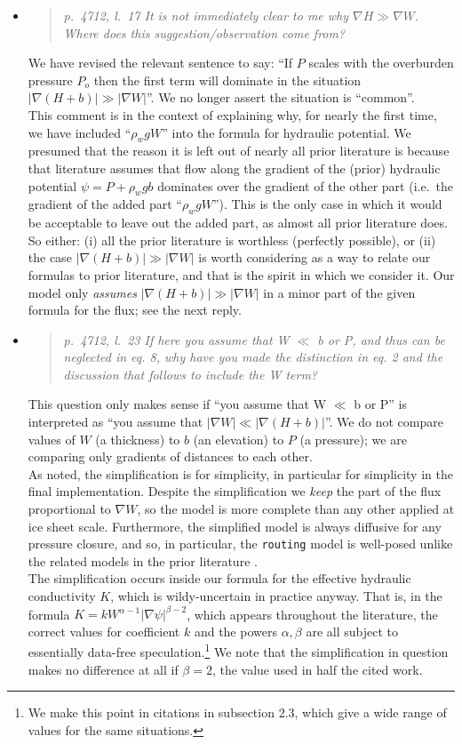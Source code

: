 \documentclass[11pt,reqno]{amsart}
\newcommand{\grad}{\nabla}
\newcommand{\reply}[2]{
\medskip\medskip
\item  \begin{quote}
\emph{#1}
\end{quote}

\medskip
\noindent #2}
\begin{document}
\begin{itemize}
\reply{p.~4712, l.~17 It is not immediately clear to me why $\nabla H \gg \nabla W$. Where does this suggestion/observation come from?}
{We have revised the relevant sentence to say: ``If $P$ scales with the overburden pressure $P_o$ then the first term will dominate in the situation $|\nabla (H+b)| \gg |\nabla W|$''.  We no longer assert the situation is ``common''.\\
\indent This comment is in the context of explaining why, for nearly the first time, we have included ``$\rho_w g W$'' into the formula for hydraulic potential.  We presumed that the reason it is left out of nearly all prior literature is because that literature assumes that flow along the gradient of the (prior) hydraulic potential $\psi = P + \rho_w g b$ dominates over the gradient of the other part (i.e.~the gradient of the added part ``$\rho_w g W$'').  This is the only case in which it would be acceptable to leave out the added part, as almost all prior literature does. \\
\indent So either: (i) all the prior literature is worthless (perfectly possible), or (ii) the case $|\nabla (H+b)| \gg |\nabla W|$ is worth considering as a way to relate our formulas to prior literature, and that is the spirit in which we consider it.  Our model only \emph{assumes} $|\nabla (H+b)| \gg |\nabla W|$ in a minor part of the given formula for the flux; see the next reply.}

\reply{p.~4712, l.~23 If here you assume that W $\ll$ b or P, and thus can be neglected in eq. 8, why have you made the distinction in eq. 2 and the discussion that follows to include the W term?}
{This question only makes sense if ``you assume that W $\ll$ b or P'' is interpreted as ``you assume that $|\nabla W| \ll |\nabla (H+b)|$''.  We do not compare values of $W$ (a thickness) to $b$ (an elevation) to $P$ (a pressure); we are comparing only gradients of distances to each other.\\
\indent As noted, the simplification is for simplicity, in particular for simplicity in the final implementation.  Despite the simplification we \emph{keep} the part of the flux proportional to $\grad W$, so the model is more complete than any other applied at ice sheet scale.  Furthermore, the simplified model is always diffusive for any pressure closure, and so, in particular, the \texttt{routing} model is well-posed unlike the related models in the prior literature \cite{LeBrocqetal2009,Siegertetal2009}. \\
\indent The simplification occurs inside our formula for the effective hydraulic conductivity $K$, which is wildy-uncertain in practice anyway.  That is, in the formula $K = k W^{\alpha-1} |\grad \psi|^{\beta-2}$, which appears throughout the literature, the correct values for coefficient $k$ and the powers $\alpha,\beta$ are all subject to essentially data-free speculation.\footnote{We make this point in citations in subsection 2.3, which give a wide range of values for the same situations.}  We note that the simplification in question makes no difference at all if $\beta=2$, the value used in half the cited work.}


\end{itemize}
\end{document}
